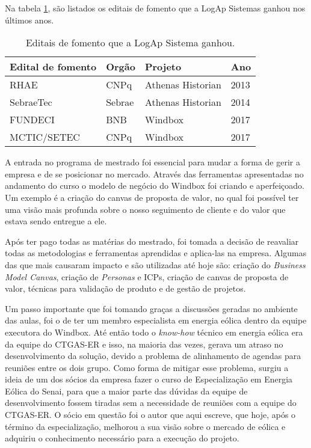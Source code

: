 Na tabela \ref{Tab:editaisFomento}, são listados os editais de fomento que a LogAp Sistemas ganhou nos últimos anos.

\begin{table}[htbp]
\begin{tabularx}{\linewidth}{|X|X|X|X|} \hline
\textbf{Edital de fomento} & \textbf{Orgão} & \textbf{Projeto} & \textbf{Ano} \\ \hline
RHAE & CNPq & Athenas Historian & 2013\\ \hline
SebraeTec & Sebrae & Athenas Historian & 2014 \\ \hline
FUNDECI & BNB & Windbox & 2017 \\ \hline
MCTIC/SETEC & CNPq & Windbox & 2017 \\ \hline
\end{tabularx}
\caption{Editais de fomento que a LogAp Sistema ganhou.}
\label{Tab:editaisFomento}
\end{table}


A entrada no programa de mestrado foi essencial para mudar a forma de gerir a empresa e de se posicionar no mercado. Através das ferramentas apresentadas no andamento do curso o modelo de negócio do Windbox foi criando e aperfeiçoado. Um exemplo é a criação do canvas de proposta de valor, no qual foi possível ter uma visão mais profunda sobre o nosso seguimento de cliente e do valor que estava sendo entregue a ele. 

Após ter pago todas as matérias do mestrado, foi tomada a decisão de reavaliar todas as metodologias e ferramentas aprendidas e aplica-las na empresa. Algumas das que mais causaram impacto e são utilizadas até hoje são: criação do \textit{Business Model Canvas}, criação de \textit{Personas} e ICPs, criação de canvas de proposta de valor, técnicas para validação de produto e de gestão de projetos. 

Um passo importante que foi tomando graças a discussões geradas no ambiente das aulas, foi o de ter um membro especialista em energia eólica dentro da equipe executora do Windbox. Até então todo o \textit{know-how} técnico em energia eólica era da equipe do CTGAS-ER e isso, na maioria das vezes, gerava um atraso no desenvolvimento da solução, devido a problema de alinhamento de agendas para reuniões entre os dois grupo. Como forma de mitigar esse problema, surgiu a ideia de um dos sócios da empresa fazer o curso de Especialização em Energia Eólica do Senai, para que a maior parte das dúvidas da equipe de desenvolvimento fossem tiradas sem a necessidade de reuniões com a equipe do CTGAS-ER. O sócio em questão foi o autor que aqui escreve, que hoje, após o término da especialização, melhorou a sua visão sobre o mercado de eólica e adquiriu o conhecimento necessário para a execução do projeto.

